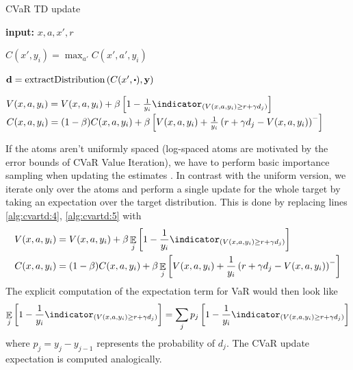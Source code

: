 \begin{algorithm}
\caption{CVaR TD update}
\begin{algorithmic}[1]\label{alg:cvartd}

    \STATE \textbf{input:} $x, a, x', r$
    
	\STATE $C(x', y_i) = \max_{a'} C(x', a', y_i)$ \label{alg:cvartd:1}
	\ENDFOR
	
	\STATE $\mathbf{d}= \text{extractDistribution}\bround{C(x', \bigcdot), \mathbf{y}}$ \label{alg:cvartd:2}

	\STATE $V(x, a, y_i) = V(x, a, y_i) + \beta \bsquare{1 - \frac{1}{y_i}\indicator_{(V(x, a, y_i) \ge r+\gamma d_j)}}$  \label{alg:cvartd:4}
	\STATE $C(x, a, y_i) = (1-\beta)C(x, a, y_i) + \beta\left[ {V(x, a, y_i) + \frac{1}{y_i}\left( {r+\gamma d_j - V(x, a, y_i)} \right)^-} \right]$\label{alg:cvartd:5}
	\ENDFOR
\end{algorithmic}
\end{algorithm}

If the atoms aren't uniformly spaced (log-spaced atoms are motivated by the error bounds of CVaR Value Iteration), we have to perform basic importance sampling when updating the estimates . In contrast with the uniform version, we iterate only over the atoms and perform a single update for the whole target by taking an expectation over the target distribution. This is done by replacing lines \ref{alg:cvartd:4}, \ref{alg:cvartd:5} with
\begin{equation}
\begin{split}
V(x, a, y_i) &= V(x, a, y_i) + \beta \expect_j\bsquare{1 - \frac{1}{y_i}\indicator_{(V(x, a, y_i) \ge r+\gamma d_j)}}\\
C(x, a, y_i) &= (1-\beta)C(x, a, y_i) + \beta\expect_j\bsquare{V(x, a, y_i) + \frac{1}{y_i}\bround{r+\gamma d_j - V(x, a, y_i)}^-}
\end{split}
\end{equation}
The explicit computation of the expectation term for VaR would then look like
\begin{equation*}
\expect_j\bsquare{1 - \frac{1}{y_i}\indicator_{(V(x, a, y_i) \ge r+\gamma d_j)}} = \sum_j p_j\bsquare{1 - \frac{1}{y_i}\indicator_{(V(x, a, y_i) \ge r+\gamma d_j)}}
\end{equation*}
where $p_j = y_{j}-y_{j-1}$ represents the probability of $d_j$. The CVaR update expectation is computed analogically.


